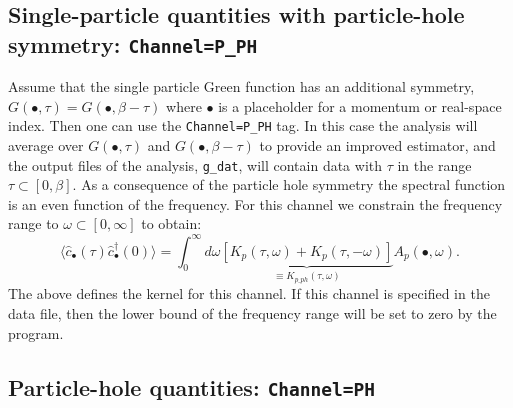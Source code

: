 \subsection{Single-particle quantities  with particle-hole  symmetry: \texttt{Channel=P\_PH}}

Assume   that  the  single  particle  Green  function  has an additional  symmetry,  
$G(\bullet,\tau) =  G(\bullet,\beta - \tau )$  where $\bullet$ is a placeholder  for   a momentum  or  
real-space    index.   Then   one  can  use  the \texttt{Channel=P\_PH}  tag.  In this  case   the analysis 
will average  over  $G(\bullet,\tau)$  and $ G(\bullet,\beta - \tau )$    to  provide  an  improved  estimator, 
and  the   output  files  of the  analysis, \texttt{g\_dat},  will  contain  data  with  $\tau$  in  the  
range  $\tau  \subset \left[ 0, \beta \right] $.  As a   consequence  of  the  particle   hole  symmetry  
the  spectral  function is an  even  function of the frequency.   For  this  channel   we    constrain
the  frequency  range  to  $\omega  \subset \left[ 0, \infty \right] $  to  obtain:
\begin{equation}
	\langle \hat{c}^{\phantom\dagger}_{\bullet} (\tau)  \hat{c}^{\dagger}_{\bullet} (0)   \rangle   = 
     \int_{0}^{\infty} d \omega  
     \underbrace{\left[ K_p(\tau,\omega) + K_p(\tau,-\omega) \right] }_{\equiv K_{p\_ph}(\tau,\omega)} 
     A_p(\bullet, \omega).
\end{equation}
The  above  defines  the  kernel  for this   channel.   If this channel  is  specified in the  data
file,   then  the lower  bound  of the  frequency  range will  be  set  to  zero by the program. 

\subsection{Particle-hole quantities:  \texttt{Channel=PH}}
\label{sec:maxent_ph}

